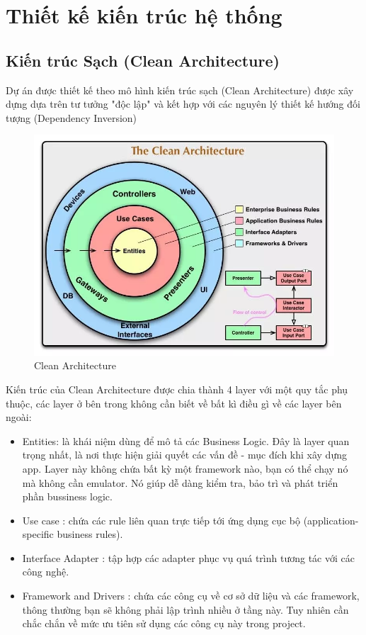 \chapter{Thiết kế kiến trúc hệ thống}
\section{Kiến trúc Sạch (Clean Architecture)}
Dự án được thiết kế theo mô hình kiến trúc sạch (Clean Architecture) được xây dựng dựa trên tư tưởng "độc lập" và kết hợp với các nguyên lý thiết kế hướng đối tượng (Dependency Inversion) \\

\begin{figure}[h]
    \centering
    \includegraphics[scale = 0.5]{img/design/clean2.png}
    \vspace{1cm}
    \caption{Clean Architecture}
    \label{fig:taskAssignment}
\end{figure}
\noindent
Kiến trúc của Clean Architecture được chia thành 4 layer với một quy tắc phụ thuộc, các layer ở bên trong không cần biết về bất kì điều gì về các layer bên ngoài:
\begin{itemize}
    \item Entities: là khái niệm dùng để mô tả các Business Logic. Đây là layer quan trọng nhất, là nơi thực hiện giải quyết các vấn đề - mục đích khi xây dựng app. Layer này không chứa bất kỳ một framework nào, bạn có thể chạy nó mà không cần emulator. Nó giúp dễ dàng kiểm tra, bảo trì và phát triển phần bussiness logic.
    \item Use case : chứa các rule liên quan trực tiếp tới ứng dụng cục bộ (application-specific business rules).
    \item Interface Adapter : tập hợp các adapter phục vụ quá trình tương tác với các công nghệ.
    \item Framework and Drivers : chứa các công cụ về cơ sở dữ liệu và các framework, thông thường bạn sẽ không phải lập trình nhiều ở tầng này. Tuy nhiên cần chắc chắn về mức ưu tiên sử dụng các công cụ này trong project.
\end{itemize}
